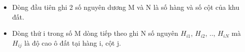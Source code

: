 \begin{itemize}
	\item Dòng đầu tiên ghi 2 số nguyên dương M và N là số hàng và số cột của khu đất.
	\item Dòng thứ i trong số M dòng tiếp theo ghi N số nguyên $H_{i1}$, $H_{i2}$, .., $H_{iN}$ mà $H_{ij}$ là độ cao ô đất tại hàng i, cột j.
\end{itemize}
